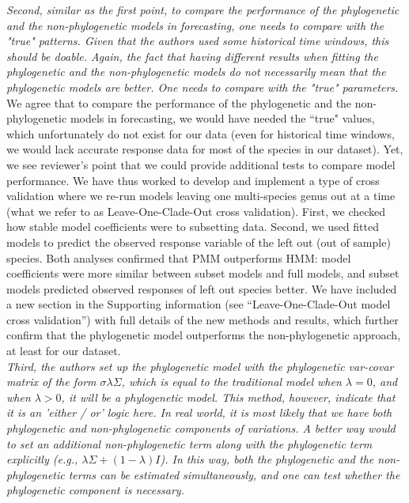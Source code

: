 \documentclass[11pt]{article}
\begin{document}
\emph{Second, similar as the first point, to compare the performance of the phylogenetic and the non-phylogenetic models in forecasting, one needs to compare with the "true" patterns. Given that the authors used some historical time windows, this should be doable. Again, the fact that having different results when fitting the phylogenetic and the non-phylogenetic models do not necessarily mean that the phylogenetic models are better. One needs to compare with the "true" parameters.}\\

We agree that to compare the performance of the phylogenetic and the non-phylogenetic models in forecasting, we would have needed the ``true" values, which unfortunately do not exist for our data (even for historical time windows, we would lack accurate response data for most of the species in our dataset). Yet, we see reviewer's point that we could provide additional tests to compare model performance. We have thus worked to develop and implement a type of cross validation where we re-run models leaving one multi-species genus out at a time (what we refer to as Leave-One-Clade-Out cross validation). First, we checked how stable model coefficients were to subsetting data. Second, we used fitted models to predict the observed response variable of the left out (out of sample) species. Both analyses confirmed that PMM outperforms HMM: model coefficients were more similar between subset models and full models, and subset models predicted observed responses of left out species better. We have included a new section in the Supporting information (see ``Leave-One-Clade-Out model cross validation'') with full details of the new methods and results, which further confirm that the phylogenetic model outperforms the non-phylogenetic approach, at least for our dataset.\\

\emph{Third, the authors set up the phylogenetic model with the phylogenetic var-covar matrix of the form $\sigma\lambda\Sigma$, which is equal to the traditional model when $\lambda=0$, and when $\lambda>0$, it will be a phylogenetic model. This method, however, indicate that it is an 'either / or' logic here. In real world, it is most likely that we have both phylogenetic and non-phylogenetic components of variations. A better way would to set an additional non-phylogenetic term along with the phylogenetic term explicitly (e.g., $\lambda \Sigma + (1-\lambda)I$). In this way, both the phylogenetic and the non-phylogenetic terms can be estimated simultaneously, and one can test whether the phylogenetic component is necessary.}\\
\end{document}
